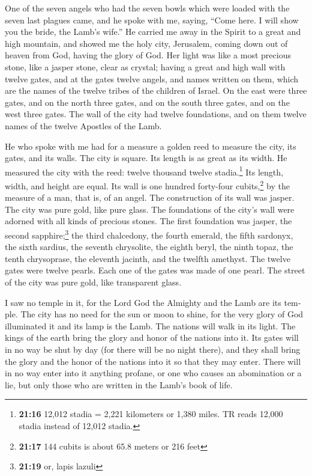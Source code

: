 \begin{paracol}{2}
\begin{otherlanguage}{english}
 One of the seven angels who had the seven bowls which
were loaded with the seven last plagues came, and he spoke with me,
saying, ``Come here. I will show you the bride, the Lamb's wife.''
 He carried me away in the Spirit to a great and high
mountain, and showed me the holy city, Jerusalem, coming down out of
heaven from God,  having the glory of God. Her light was
like a most precious stone, like a jasper stone, clear as crystal;
 having a great and high wall with twelve gates, and at
the gates twelve angels, and names written on them, which are the names
of the twelve tribes of the children of Israel.  On the
east were three gates, and on the north three gates, and on the south
three gates, and on the west three gates.  The wall of
the city had twelve foundations, and on them twelve names of the twelve
Apostles of the Lamb.

 He who spoke with me had for a measure a golden reed to
measure the city, its gates, and its walls.  The city is
square. Its length is as great as its width. He measured the city with
the reed: twelve thousand twelve stadia.\footnote{\textbf{21:16} 12,012
  stadia = 2,221 kilometers or 1,380 miles. TR reads 12,000 stadia
  instead of 12,012 stadia.} Its length, width, and height are equal.
 Its wall is one hundred forty-four cubits,\footnote{\textbf{21:17}
  144 cubits is about 65.8 meters or 216 feet} by the measure of a man,
that is, of an angel.  The construction of its wall was
jasper. The city was pure gold, like pure glass.  The
foundations of the city's wall were adorned with all kinds of precious
stones. The first foundation was jasper, the second sapphire;\footnote{\textbf{21:19}
  or, lapis lazuli} the third chalcedony, the fourth emerald,
 the fifth sardonyx, the sixth sardius, the seventh
chrysolite, the eighth beryl, the ninth topaz, the tenth chrysoprase,
the eleventh jacinth, and the twelfth amethyst.  The
twelve gates were twelve pearls. Each one of the gates was made of one
pearl. The street of the city was pure gold, like transparent glass.

 I saw no temple in it, for the Lord God the Almighty and
the Lamb are its temple.  The city has no need for the
sun or moon to shine, for the very glory of God illuminated it and its
lamp is the Lamb.  The nations will walk in its light.
The kings of the earth bring the glory and honor of the nations into it.
 Its gates will in no way be shut by day (for there will
be no night there),  and they shall bring the glory and
the honor of the nations into it so that they may enter. 
There will in no way enter into it anything profane, or one who causes
an abomination or a lie, but only those who are written in the Lamb's
book of life.


\end{otherlanguage}
\end{paracol}

